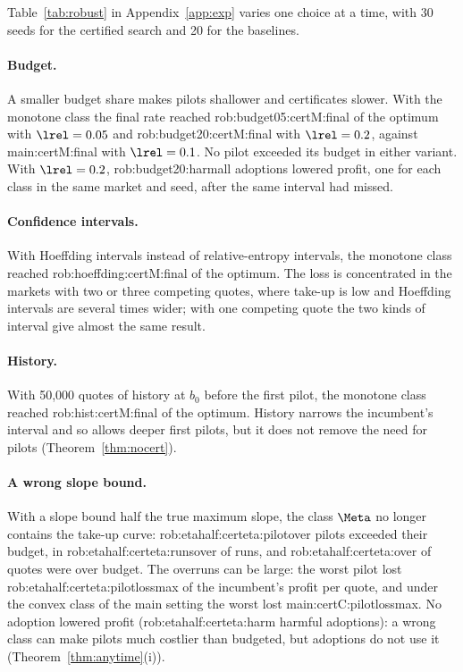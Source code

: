 Table~\ref{tab:robust} in Appendix~\ref{app:exp} varies one choice at a time, with 30 seeds for the certified search
and 20 for the baselines.

\paragraph{Budget.} A smaller budget share makes pilots shallower and certificates slower. With the monotone class
the final rate reached \num{rob:budget05:certM:final} of the optimum with $\lrel=0.05$ and
\num{rob:budget20:certM:final} with $\lrel=0.2$, against \num{main:certM:final} with $\lrel=0.1$. No pilot exceeded
its budget in either variant. With $\lrel=0.2$, \num{rob:budget20:harmall} adoptions lowered profit, one for each
class in the same market and seed, after the same interval had missed.

\paragraph{Confidence intervals.} With Hoeffding intervals instead of relative-entropy intervals, the monotone class
reached \num{rob:hoeffding:certM:final} of the optimum. The loss is concentrated in the markets with two or three
competing quotes, where take-up is low and Hoeffding intervals are several times wider; with one competing quote
the two kinds of interval give almost the same result.

\paragraph{History.} With 50{,}000 quotes of history at $b_0$ before the first pilot, the monotone class reached
\num{rob:hist:certM:final} of the optimum. History narrows the incumbent's interval and so allows deeper first
pilots, but it does not remove the need for pilots (Theorem~\ref{thm:nocert}).

\paragraph{A wrong slope bound.} With a slope bound half the true maximum slope, the class $\Meta$ no longer contains
the take-up curve: \num{rob:etahalf:certeta:pilotover} pilots exceeded their budget, in
\num{rob:etahalf:certeta:runsover} of runs, and \num{rob:etahalf:certeta:over} of quotes were over budget. The
overruns can be large: the worst pilot lost \num{rob:etahalf:certeta:pilotlossmax} of the incumbent's profit per
quote, and under the convex class of the main setting the worst lost \num{main:certC:pilotlossmax}. No adoption
lowered profit (\num{rob:etahalf:certeta:harm} harmful adoptions): a wrong class can make pilots much costlier than
budgeted, but adoptions do not use it (Theorem~\ref{thm:anytime}(i)).

